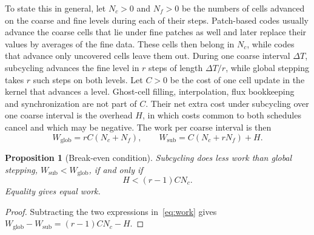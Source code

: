 \documentclass[12pt]{article}
\newtheorem{proposition}{Proposition}
\theoremstyle{remark}
\newcommand{\WG}{W_{\mathrm{glob}}}
\newcommand{\WL}{W_{\mathrm{sub}}}
\begin{document}
To state this in general, let $N_c>0$ and $N_f>0$ be the numbers of cells advanced on the coarse and fine levels during each of their steps. Patch-based codes usually advance the coarse cells that lie under fine patches as well and later replace their values by averages of the fine data. These cells then belong in $N_c$, while codes that advance only uncovered cells leave them out. During one coarse interval $\Delta T$, subcycling advances the fine level in $r$ steps of length $\Delta T/r$, while global stepping takes $r$ such steps on both levels. Let $C>0$ be the cost of one cell update in the kernel that advances a level. Ghost-cell filling, interpolation, flux bookkeeping and synchronization are not part of $C$. Their net extra cost under subcycling over one coarse interval is the overhead $H$, in which costs common to both schedules cancel and which may be negative. The work per coarse interval is then
\begin{equation}\label{eq:work}
\WG = rC(N_c+N_f), \qquad \WL = C(N_c+rN_f)+H .
\end{equation}

\begin{proposition}[Break-even condition]\label{prop:break}
Subcycling does less work than global stepping, $\WL<\WG$, if and only if
\begin{equation}\label{eq:break}
H<(r-1)CN_c .
\end{equation}
Equality gives equal work.
\end{proposition}

\begin{proof}
Subtracting the two expressions in~\eqref{eq:work} gives $\WG-\WL=(r-1)CN_c-H$.
\end{proof}
\end{document}
